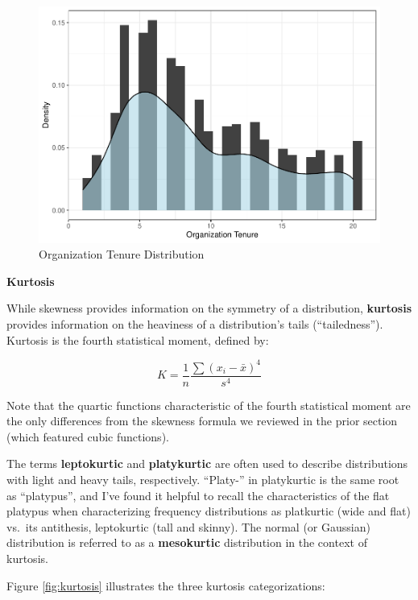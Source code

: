 \documentclass[]{book}
\begin{document}
\begin{figure}

{\centering \includegraphics{_main_files/figure-latex/org-tenure-distribution-1} 

}

\caption{Organization Tenure Distribution}\label{fig:org-tenure-distribution}
\end{figure}

\textbf{Kurtosis}

While skewness provides information on the symmetry of a distribution, \textbf{kurtosis} provides information on the heaviness of a distribution's tails (``tailedness''). Kurtosis is the fourth statistical moment, defined by:

\[ K = \frac{1}{n} \frac{\sum(x_i-\bar{x})^4}{s^4} \]

Note that the quartic functions characteristic of the fourth statistical moment are the only differences from the skewness formula we reviewed in the prior section (which featured cubic functions).

The terms \textbf{leptokurtic} and \textbf{platykurtic} are often used to describe distributions with light and heavy tails, respectively. ``Platy-'' in platykurtic is the same root as ``platypus'', and I've found it helpful to recall the characteristics of the flat platypus when characterizing frequency distributions as platkurtic (wide and flat) vs.~its antithesis, leptokurtic (tall and skinny). The normal (or Gaussian) distribution is referred to as a \textbf{mesokurtic} distribution in the context of kurtosis.

Figure \ref{fig:kurtosis} illustrates the three kurtosis categorizations:
\end{document}
